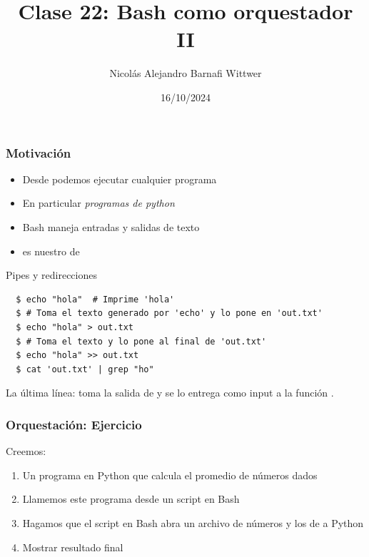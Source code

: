 \documentclass[14pt,aspectratio=169,xcolor=dvipsnames]{beamer}
\title[short title]{Clase 22: Bash como orquestador II}
\subtitle{}
\author[NA Barnafi] {Nicolás Alejandro Barnafi Wittwer}
\institute[UC|CMM] 
{
    Pontificia Universidad Católica de Chile \\
    Centro de Modelamiento Matemático
}
\date{16/10/2024}
\begin{document}
\begin{frame}
    \maketitle
\end{frame}
\begin{frame}\frametitle{Motivación}
    \begin{itemize}
        \item Desde  podemos ejecutar cualquier programa
        \item En particular \emph{programas de python}
        \item Bash maneja entradas y salidas de texto
        \item {} es nuestro  de 
    \end{itemize}
\end{frame}
\begin{frame}[fragile]{Pipes y redirecciones}
    \begin{small}
    \begin{verbatim}
  $ echo "hola"  # Imprime 'hola'
  $ # Toma el texto generado por 'echo' y lo pone en 'out.txt'
  $ echo "hola" > out.txt 
  $ # Toma el texto y lo pone al final de 'out.txt'
  $ echo "hola" >> out.txt 
  $ cat 'out.txt' | grep "ho"
    \end{verbatim} 
    \end{small}
La última línea: toma la salida de  y se lo entrega como input a la función .

\end{frame}
\begin{frame}[fragile]\frametitle{Orquestación: Ejercicio}
    Creemos: 
    \begin{enumerate}
        \item Un programa en Python que calcula el promedio de números dados
        \item Llamemos este programa desde un script en Bash
        \item Hagamos que el script en Bash abra un archivo de números y los de a Python
        \item Mostrar resultado final
    \end{enumerate}
\end{frame}
\end{document}
